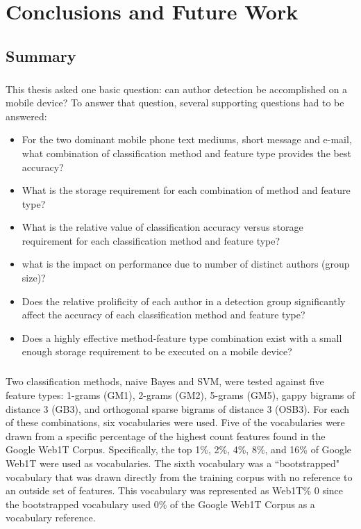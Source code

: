 \chapter{Conclusions and Future Work}

\section{Summary}
\paragraph*{} This thesis asked one basic question: can author detection be accomplished on a mobile device?  To answer that question, several supporting questions had to be answered: 
\begin{itemize}
	\item For the two dominant mobile phone text mediums, short message and e-mail, what combination of classification method and feature type provides the best accuracy?
	\item What is the storage requirement for each combination of method and feature type?
	\item What is the relative value of classification accuracy versus storage requirement for each classification method and feature type?
	\item what is the impact on performance due to number of distinct authors (group size)?
	\item Does the relative prolificity of each author in a detection group significantly affect the accuracy of each classification method and feature type?
	\item Does a highly effective method-feature type combination exist with a small enough storage requirement to be executed on a mobile device?
\end{itemize}

	\paragraph*{} Two classification methods, naive Bayes and SVM, were tested against five feature types: 1-grams (GM1), 2-grams (GM2), 5-grams (GM5), gappy bigrams of distance 3 (GB3), and orthogonal sparse bigrams of distance 3 (OSB3).  For each of these combinations, six vocabularies were used.  Five of the vocabularies were drawn from a specific percentage of the highest count features found in the Google Web1T Corpus.  Specifically, the top 1\%, 2\%, 4\%, 8\%, and 16\% of Google Web1T were used as vocabularies.  The sixth vocabulary was a ``bootstrapped" vocabulary that was drawn directly from the training corpus with no reference to an outside set of features.  This vocabulary was represented as Web1T\% 0 since the bootstrapped vocabulary used 0\% of the Google Web1T Corpus as a vocabulary reference.

